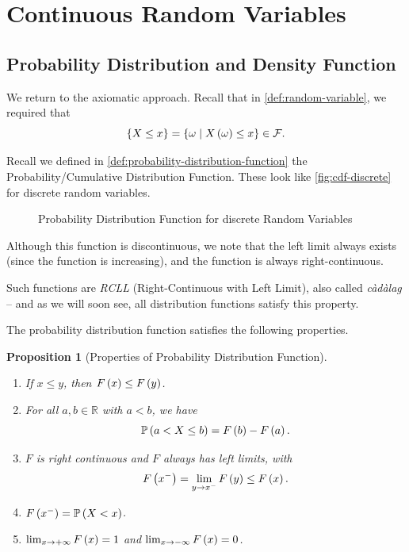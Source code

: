 \documentclass{article}
\newtheorem{proposition}[theorem]{Proposition}
\theoremstyle{definition}
\theoremstyle{remark}
\newcommand{\RR}{\mathbb{R}}
\newcommand{\Prob}{\mathbb{P}}
\newcommand{\eventSpace}{\mathcal{F}}
\newcommand{\plusinfty}{+\infty}
\newcommand{\minusinfty}{-\infty}
\newcommand{\set}[2]{\{#1\mid #2\}}
\begin{document}
\section{Continuous Random Variables}

\subsection{Probability Distribution and Density Function}

We return to the axiomatic approach. Recall that in \autoref{def:random-variable}, we required that
\[
    \Bqty{X \leq x} = \set{\omega}{X\pqty{\omega} \leq x} \in \eventSpace.
\]

Recall we defined in \autoref{def:probability-distribution-function} the Probability/Cumulative Distribution Function. These look like \autoref{fig:cdf-discrete} for discrete random variables.

\begin{figure}[ht!]
    \centering
    \par


    \caption{Probability Distribution Function for discrete Random Variables}
    \label{fig:cdf-discrete}
\end{figure}

Although this function is discontinuous, we note that the left limit always exists (since the function is increasing), and the function is always right-continuous.

Such functions are \emph{RCLL} (Right-Continuous with Left Limit), also called \emph{c\`{a}d\`{a}lag} -- and as we will soon see, all distribution functions satisfy this property.

The probability distribution function satisfies the following properties.

\begin{proposition}[Properties of Probability Distribution Function]
    \label{prop:property-probability-distribution-fn}%
    \begin{enumerate}
        \item If \(x \leq y\), then \(F\left(x\right) \leq F\left(y\right)\).
        \item For all \(a, b \in \RR\) with \(a < b\), we have
        \[
            \Prob\pqty{a < X \leq b} = F\pqty{b} - F\pqty{a}.
        \]
        \item \(F\) is right continuous and \(F\) always has left limits, with
        \[
            F\left(x^-\right) = \lim_{y \to x^-} F\left(y\right) \leq F\left(x\right).
        \]
        \item \(F\pqty{x^-} = \Prob\pqty{X < x}\).
        \item \(\lim_{x \to \plusinfty} F\pqty{x} = 1\) and \(\lim_{x \to \minusinfty} F\pqty{x} = 0\).
    \end{enumerate}
\end{proposition}
\end{document}
